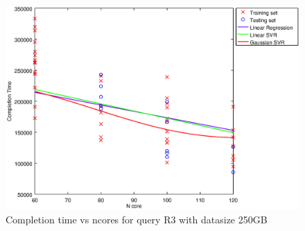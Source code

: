 
\begin {figure}[hbtp]
\centering
\includegraphics[width=\textwidth]{output/R3_250_LINEAR_NCORE/plot_R3_250_bestmodels.eps}
\caption{Completion time vs ncores for query R3 with datasize 250GB}
\label{fig:coreonly_linear_R3_250}
\end {figure}
